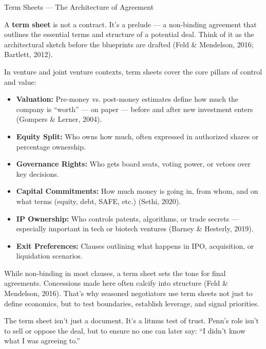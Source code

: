 \begin{TechnicalSidebar}{Term Sheets — The Architecture of Agreement}

  A \textbf{term sheet} is not a contract. It’s a prelude — a non-binding agreement that outlines the essential terms 
  and structure of a potential deal. Think of it as the architectural sketch before the blueprints are drafted 
  (Feld \& Mendelson, 2016; Bartlett, 2012).
  
  \medskip
  
  In venture and joint venture contexts, term sheets cover the core pillars of control and value:

  \begin{itemize}
    \item \textbf{Valuation:} Pre-money vs. post-money estimates define how much the company is “worth” — on paper — 
    before and after new investment enters (Gompers \& Lerner, 2004).
    \item \textbf{Equity Split:} Who owns how much, often expressed in authorized shares or percentage ownership.
    \item \textbf{Governance Rights:} Who gets board seats, voting power, or vetoes over key decisions.
    \item \textbf{Capital Commitments:} How much money is going in, from whom, and on what terms (equity, debt, SAFE, etc.) 
    (Sethi, 2020).
    \item \textbf{IP Ownership:} Who controls patents, algorithms, or trade secrets — especially important in tech or 
    biotech ventures (Barney \& Hesterly, 2019).
    \item \textbf{Exit Preferences:} Clauses outlining what happens in IPO, acquisition, or liquidation scenarios.
  \end{itemize}
  
  \medskip
  
  While non-binding in most clauses, a term sheet sets the tone for final agreements. Concessions made 
  here often calcify into structure (Feld \& Mendelson, 2016). That’s why seasoned negotiators use term sheets 
  not just to define economics, but to test boundaries, establish leverage, and signal priorities.
  
  \medskip
  
  The term sheet isn’t just a document. It’s a litmus test of trust. Penn’s role isn’t to sell 
  or oppose the deal, but to ensure no one can later say: ``I didn’t know what I was agreeing to.''

\end{TechnicalSidebar}



